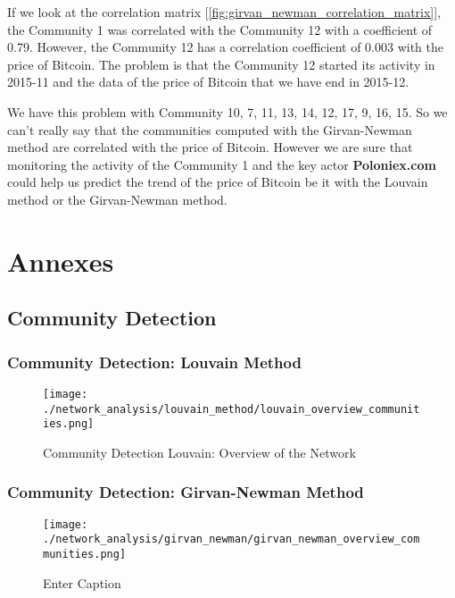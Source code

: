 \documentclass[a4paper, 12pt]{article}
\begin{document}
If we look at the correlation matrix [\ref{fig:girvan_newman_correlation_matrix}], the Community 1 was correlated with the Community 12 with
a coefficient of 0.79. However, the Community 12 has a correlation coefficient of 0.003 with the price of Bitcoin. 
The problem is that the Community 12 started its activity in 2015-11 and the data of the price of Bitcoin that we have end in 2015-12.

We have this problem with Community 10, 7, 11, 13, 14, 12, 17, 9, 16, 15.
So we can't really say that the communities computed with the Girvan-Newman method are correlated with the price of Bitcoin.
However we are sure that monitoring the activity of the Community 1 and the key actor \textbf{Poloniex.com} 
could help us predict the trend of the price of Bitcoin be it with the Louvain method or the Girvan-Newman method.


\newpage



\section{Annexes}

\subsection{Community Detection}

\subsubsection{Community Detection: Louvain Method}

\begin{figure}[h]
    \centering
    \texttt{[image: ./network\_analysis/louvain\_method/louvain\_overview\_communities.png]}
    \caption{Community Detection Louvain: Overview of the Network}
    \label{fig:louvain_overview_communities}
\end{figure}

\subsubsection{Community Detection: Girvan-Newman Method}

\begin{figure}[h]
    \centering
    \texttt{[image: ./network\_analysis/girvan\_newman/girvan\_newman\_overview\_communities.png]}
    \caption{Enter Caption}
    \label{fig:girvan_newman_overview_communities}
\end{figure}
\end{document}
